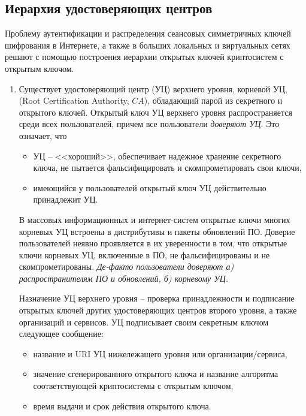 \subsection{Иерархия удостоверяющих центров}

Проблему аутентификации и распределения сеансовых симметричных ключей шифрования в Интернете, а также в больших локальных и виртуальных сетях решают с помощью построения иерархии открытых ключей криптосистем с открытым ключом.

\begin{enumerate}
    \item Существует удостоверяющий центр (УЦ) верхнего уровня, корневой УЦ, (Root Certification Authority, $CA$), обладающий парой из секретного и открытого ключей. Открытый ключ УЦ верхнего уровня распространяется среди всех пользователей, причем все пользователи \emph{доверяют УЦ}. Это означает, что
        \begin{itemize}
            \item УЦ -- <<хороший>>, обеспечивает надежное хранение секретного ключа, не пытается фальсифицировать и скомпрометировать свои ключи,
            \item имеющийся у пользователей открытый ключ УЦ действительно принадлежит УЦ.
        \end{itemize}
        В массовых информационных и интернет-систем открытые ключи многих корневых УЦ встроены в дистрибутивы и пакеты обновлений ПО. Доверие пользователей неявно проявляется в их уверенности в том, что открытые ключи корневых УЦ, включенные в ПО, не фальсифицированы и не скомпрометированы. \emph{Де-факто пользователи доверяют а) распространителям ПО и обновлений, б) корневому УЦ.}

        Назначение УЦ верхнего уровня -- проверка принадлежности и подписание открытых ключей других удостоверяющих центров второго уровня, а также организаций и сервисов. УЦ подписывает своим секретным ключом следующее сообщение:
        \begin{itemize}
            \item название и URI УЦ нижележащего уровня или организации/сервиса,
            \item значение сгенерированного открытого ключа и название алгоритма соответствующей криптосистемы с открытым ключом,
            \item время выдачи и срок действия открытого ключа.
        \end{itemize}


\end{enumerate}
